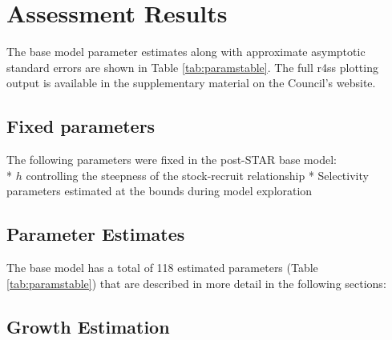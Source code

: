 \documentclass[11pt,
  english,
]{article}
\begin{document}

\hypertarget{assessment-results}{%
\section{Assessment Results}\label{assessment-results}}

\leavevmode\tagmcend\tagstructend

The base model parameter estimates along with approximate asymptotic standard errors are shown in Table \ref{tab:paramstable}. The full r4ss plotting output is available in the supplementary material on the Council's website.


\hypertarget{fixed-parameters}{%
\subsection{Fixed parameters}\label{fixed-parameters}}

\leavevmode\tagmcend\tagstructend

The following parameters were fixed in the post-STAR base model:\\
* {\(h\)\leavevmode\tagmcend\tagstructend} controlling the steepness of the stock-recruit relationship * Selectivity parameters estimated at the bounds during model exploration


\hypertarget{parameter-estimates}{%
\subsection{Parameter Estimates}\label{parameter-estimates}}

\leavevmode\tagmcend\tagstructend

The base model has a total of 118 estimated parameters (Table \ref{tab:paramstable}) that are described in more detail in the following sections:


\hypertarget{growth-estimation}{%
\subsection{Growth Estimation}\label{growth-estimation}}

\leavevmode\tagmcend\tagstructend
\end{document}
